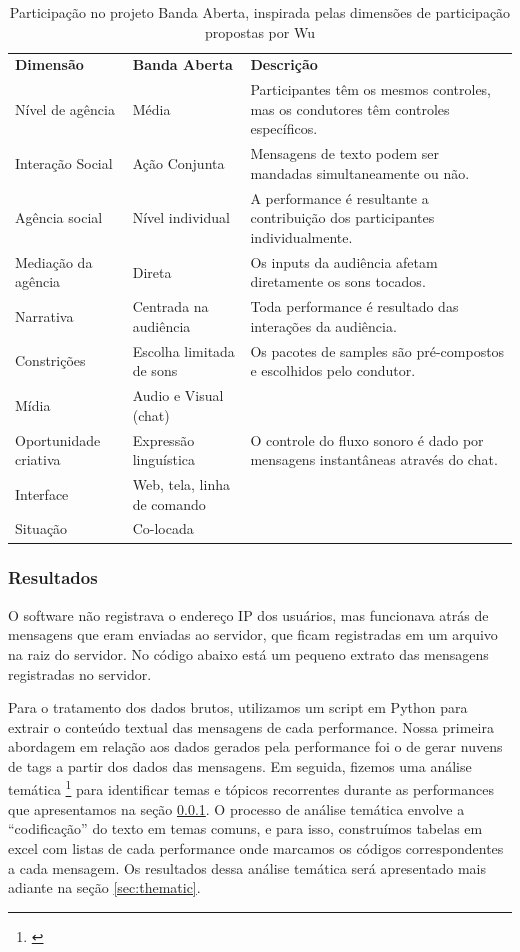 \begin{table}
\ABNTEXfontereduzida
\setlength\extrarowheight{-2pt}
\caption{Participação no projeto Banda Aberta, inspirada pelas dimensões de participação propostas por Wu \cite{wu2017open}}{%
\begin{tabular}{p{3cm}p{3cm}p{6cm}}
\hline
\textbf{Dimensão } & \textbf{Banda Aberta} & \textbf{Descrição} \\
Nível de agência & Média & Participantes têm os mesmos controles, mas os condutores têm controles específicos.\\
Interação Social & Ação Conjunta & Mensagens de texto podem ser mandadas simultaneamente ou não.\\
Agência social  & Nível individual & A performance é resultante a contribuição dos participantes individualmente.\\
Mediação da agência & Direta & Os inputs da audiência afetam diretamente os sons tocados. \\
Narrativa & Centrada na audiência & Toda performance é resultado das interações da audiência.\\
Constrições & Escolha limitada de sons & Os pacotes de samples são pré-compostos e escolhidos pelo condutor.\\
Mídia & Audio e Visual (chat) & \\
Oportunidade criativa & Expressão linguística & O controle do fluxo sonoro é dado por mensagens instantâneas através do chat.\\
Interface & Web, tela, linha de comando & \\
Situação & Co-locada & \\
\hline
\end{tabular}}
\label{tab:participation}
\end{table}

\newpage

\subsubsection{Resultados}

O software não registrava o endereço IP dos usuários, mas funcionava atrás de mensagens que eram enviadas ao servidor, que ficam registradas em um arquivo na raiz do servidor. No código abaixo está um pequeno extrato das mensagens registradas no servidor. 




Para o tratamento dos dados brutos, utilizamos um script em Python para extrair o conteúdo textual das mensagens de cada performance. Nossa primeira abordagem em relação aos dados gerados pela performance foi o de gerar nuvens de tags a partir dos dados das mensagens. Em seguida, fizemos uma análise temática \footnote{\cite{Braun2006}} para identificar temas e tópicos recorrentes durante as performances que apresentamos na seção \ref{}. O processo de análise temática envolve a ``codificação'' do texto em temas comuns, e para isso, construímos tabelas em excel com listas de cada performance onde marcamos os códigos correspondentes a cada mensagem. Os resultados dessa análise temática será apresentado mais adiante na seção \ref{sec:thematic}. 

